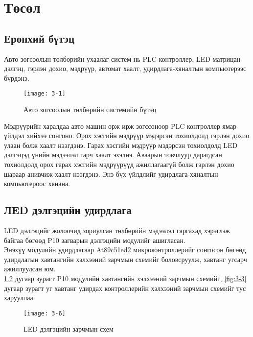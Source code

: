 
\chapter{Төсөл} %

\label{Chapter3} %


\pagecolor{white}
\section{Ерөнхий бүтэц} 
Авто зогсоолын төлбөрийн ухаалаг систем нь PLC контроллер, LED матрицан дэлгэц, гэрлэн дохио, мэдрүүр, автомат хаалт, удирдлага-хяналтын компьютерээс бүрдэнэ.\\
\begin{figure}[!ht]
	\centering
	\texttt{[image: 3-1]}
	\caption{Авто зогсоолын төлбөрийн системийн бүтэц}
	\label{fig:3-1}
\end{figure}
Мэдрүүрийн харалдаа авто машин орж ирж зогссоноор PLC контроллер ямар үйлдэл хийхээ сонгоно. Орох хэсгийн мэдрүүр мэдэрсэн тохиолдолд гэрлэн дохио улаан болж хаалт нээгдэнэ. Гарах хэсгийн мэдрүүр мэдэрсэн тохиолдолд LED дэлгэцэд үнийн мэдээлэл гарч хаалт эхэлнэ. Аваарын товчлуур дарагдсан тохиолдолд орох гарах хэсгийн мэдрүүрүүд ажиллагаагүй болж гэрлэн дохио шараар анивчиж хаалт нээгдэнэ. Энэ бүх үйлдлийг удирдлага-хяналтын компьютероос хянана. 
\section{ЛED дэлгэцийн удирдлага}
LED дэлгэцийг жолоочид зориулсан төлбөрийн мэдээлэл гаргахад хэрэглэж байгаа бөгөөд P10 загварын дэлгэцийн модулийг ашигласан. \\

Энэхүү модулийн удирдлагаар At89c51ed2 микроконтроллерийг сонгосон бөгөөд удирдлагын хавтангийн хэлхээний зарчмын схемийг боловсруулж, хавтанг угсарч ажиллуулсан юм. \\

\ref{fig:3-2} дугаар зурагт P10 модулийн хавтангийн хэлхээний зарчмын схемийг, \ref{fig:3-3} дугаар зурагт уг хавтанг удирдах контроллерийн хэлхээний зарчмын схемийг тус харууллаа. \\
\newpage
\begin{figure}[!ht]
	\centering
	\begin{turn}{90}
	\texttt{[image: 3-6]}
	\end{turn}
	\caption{LED дэлгэцийн зарчмын схем}
	\label{fig:3-2}
\end{figure}
\newpage

